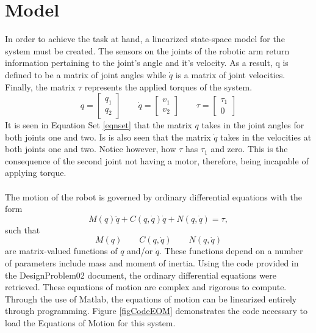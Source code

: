 \documentclass[12pt]{article}
\begin{document}
\section{Model} \label{Model}
In order to achieve the task at hand, a linearized state-space model for the system must be created. The sensors on the joints of the robotic arm return information pertaining to the joint's angle and it's velocity. As a result, q is defined to be a matrix of joint angles while $\dot{q}$ is a matrix of joint velocities. Finally, the matrix $\tau$ represents the applied torques of the system.
\begin{equation}
\label{eqnset}
q = \begin{bmatrix} q_{1} \\ q_{2} \end{bmatrix}
\qquad
\dot{q} = \begin{bmatrix} v_{1} \\ v_{2} \end{bmatrix}
\qquad
\tau = \begin{bmatrix} \tau_{1} \\ 0 \end{bmatrix}
\end{equation}
It is seen in Equation Set \eqref{eqnset} that the matrix $q$ takes in the joint angles for both joints one and two. Is is also seen that the matrix $\dot{q}$ takes in the velocities at both joints one and two. Notice however, how $\tau$ has $\tau_{1}$ and zero. This is the consequence of the second joint not having a motor, therefore, being incapable of applying torque.
\\ \\
The motion of the robot is governed by ordinary differential equations with the form
\begin{equation}
\label{eqEOM}
M(q) \ddot{q} + C(q,\dot{q})\dot{q} + N(q,\dot{q}) = \tau,
\end{equation}
such that 
\begin{equation*}
M(q) \qquad C(q,\dot{q}) \qquad N(q,\dot{q})
\end{equation*}
are matrix-valued functions of $q$ and/or $\dot{q}$. These functions depend on a number of parameters include mass and moment of inertia.  Using the code provided in the DesignProblem02 document, the ordinary differential equations were retrieved. These equations of motion are complex and rigorous to compute. Through the use of Matlab, the equations of motion can be linearized entirely through programming. Figure \ref{figCodeEOM} demonstrates the code necessary to load the Equations of Motion for this system.
\end{document}
